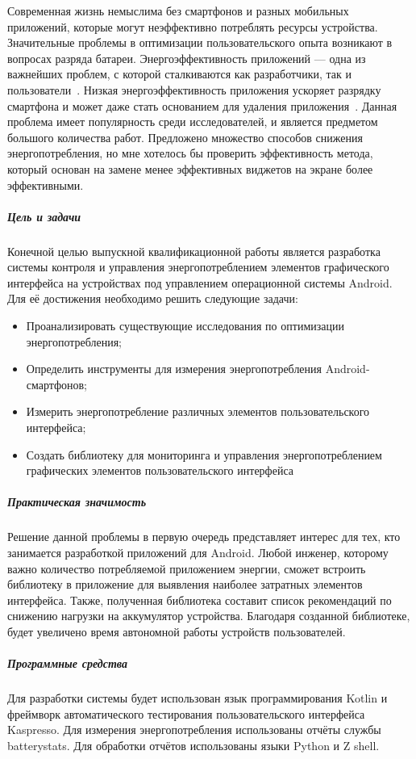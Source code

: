 

Современная жизнь немыслима без смартфонов и разных мобильных приложений, которые могут неэффективно потреблять ресурсы устройства. Значительные проблемы в оптимизации пользовательского опыта возникают в вопросах разряда батареи. Энергоэффективность приложений --- одна из важнейших проблем, с которой сталкиваются как разработчики, так и пользователи~\parencite{man2016experience, wasserman2010software}. Низкая энергоэффективность приложения ускоряет разрядку смартфона и может даже стать основанием для удаления приложения~\parencite{ickin2017users}. Данная проблема имеет популярность среди исследователей, и является предметом большого количества работ. Предложено множество способов снижения энергопотребления, но мне хотелось бы проверить эффективность метода, который основан на замене менее эффективных виджетов на экране более эффективными.

\subparagraph{Цель и задачи}
Конечной целью выпускной квалификационной работы является разработка системы контроля и управления энергопотреблением элементов графического интерфейса на устройствах под управлением операционной системы Android. Для её достижения необходимо решить следующие задачи:
\begin{itemize}
	\item Проанализировать существующие исследования по оптимизации энергопотребления;
	\item Определить инструменты для измерения энергопотребления Android-смартфонов;
	\item Измерить энергопотребление различных элементов пользовательского интерфейса;
	\item Создать библиотеку для мониторинга и управления энергопотреблением графических элементов пользовательского интерфейса
\end{itemize}

\subparagraph{Практическая значимость}
Решение данной проблемы в первую очередь представляет интерес для тех, кто занимается разработкой приложений для Android. Любой инженер, которому важно количество потребляемой приложением энергии, сможет встроить библиотеку в приложение для выявления наиболее затратных элементов интерфейса. Также, полученная библиотека составит список рекомендаций по снижению нагрузки на аккумулятор устройства. Благодаря созданной библиотеке, будет увеличено время автономной работы устройств пользователей.

\subparagraph{Программные средства}
Для разработки системы будет использован язык программирования Kotlin и фреймворк автоматического тестирования пользовательского интерфейса Kaspresso. Для измерения энергопотребления использованы отчёты службы batterystats. Для обработки отчётов использованы языки Python и Z shell.